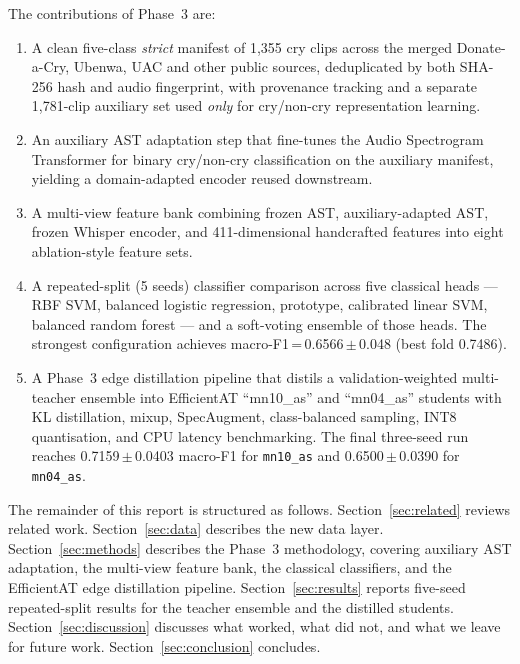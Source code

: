 \documentclass[11pt,a4paper]{article}
\begin{document}
The contributions of Phase~3 are:

\begin{enumerate}[nosep]
  \item A clean five-class \emph{strict} manifest of 1{,}355 cry clips
        across the merged Donate-a-Cry, Ubenwa, UAC and other public
        sources, deduplicated by both SHA-256 hash and audio
        fingerprint, with provenance tracking and a separate 1{,}781-clip
        auxiliary set used \emph{only} for cry/non-cry representation
        learning.
  \item An auxiliary AST adaptation step that fine-tunes the Audio
        Spectrogram Transformer for binary cry/non-cry classification on
        the auxiliary manifest, yielding a domain-adapted encoder reused
        downstream.
  \item A multi-view feature bank combining frozen AST, auxiliary-adapted
        AST, frozen Whisper encoder, and 411-dimensional handcrafted
        features into eight ablation-style feature sets.
  \item A repeated-split (5 seeds) classifier comparison across five
        classical heads --- RBF SVM, balanced logistic regression,
        prototype, calibrated linear SVM, balanced random forest --- and
        a soft-voting ensemble of those heads. The strongest
        configuration achieves
        macro-F1\,=\,0.6566\,$\pm$\,0.048 (best fold 0.7486).
  \item A Phase~3 edge distillation pipeline that distils a
        validation-weighted multi-teacher ensemble into EfficientAT
        ``mn10\_as'' and ``mn04\_as'' students with KL distillation,
        mixup, SpecAugment, class-balanced sampling, INT8 quantisation,
        and CPU latency benchmarking. The final three-seed run reaches
        0.7159\,$\pm$\,0.0403 macro-F1 for \texttt{mn10\_as} and
        0.6500\,$\pm$\,0.0390 for \texttt{mn04\_as}.
\end{enumerate}

The remainder of this report is structured as follows.
Section~\ref{sec:related} reviews related work.
Section~\ref{sec:data} describes the new data layer.
Section~\ref{sec:methods} describes the Phase~3 methodology, covering
auxiliary AST adaptation, the multi-view feature bank, the classical
classifiers, and the EfficientAT edge distillation pipeline.
Section~\ref{sec:results} reports five-seed repeated-split results for
the teacher ensemble and the distilled students.
Section~\ref{sec:discussion} discusses what worked, what did not, and
what we leave for future work.
Section~\ref{sec:conclusion} concludes.
\end{document}
